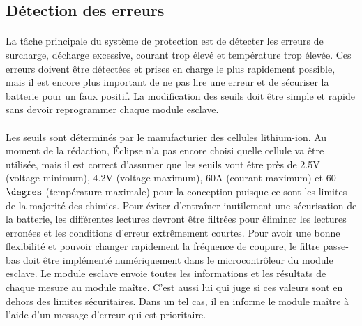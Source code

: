 
\subsection{Détection des erreurs}
	\paragraph*{}
	La tâche principale du système de protection est de détecter les erreurs de surcharge, décharge excessive, courant trop élevé et température trop élevée. Ces erreurs doivent être détectées et prises en charge le plus rapidement possible, mais il est encore plus important de ne pas lire une erreur et de sécuriser la batterie pour un faux positif. La modification des seuils doit être simple et rapide sans devoir reprogrammer chaque module esclave. 

	\paragraph*{}
	Les seuils sont déterminés par le manufacturier des cellules lithium-ion. Au moment de la rédaction, Éclipse n'a pas encore choisi quelle cellule va être utilisée, mais il est correct d'assumer que les seuils vont être près de 2.5V (voltage minimum), 4.2V (voltage maximum), 60A (courant maximum) et 60 $\degres$ (température maximale) pour la conception puisque ce sont les limites de la majorité des chimies. Pour éviter d'entraîner inutilement une sécurisation de la batterie, les différentes lectures devront être filtrées pour éliminer les lectures erronées et les conditions d'erreur extrêmement courtes. Pour avoir une bonne flexibilité et pouvoir changer rapidement la fréquence de coupure, le filtre passe-bas doit être implémenté numériquement dans le microcontrôleur du module esclave. Le module esclave envoie toutes les informations et les résultats de chaque mesure au module maître. C'est aussi lui qui juge si ces valeurs sont en dehors des limites sécuritaires. Dans un tel cas, il en informe le module maître à l'aide d'un message d'erreur qui est prioritaire.
 
 \newpage